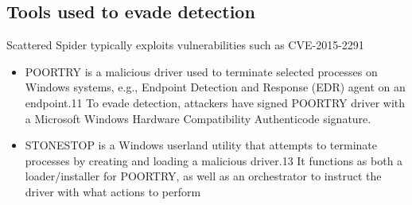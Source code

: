 \documentclass[
	letterpaper, %
	10pt, %
	unnumberedsections, %
	twoside, %
]{APAAssignment}
\begin{document}
\begin{appendices}
	\section{Tools used to evade detection}\label{app:DetectionAvoidance}
	Scattered Spider typically exploits vulnerabilities such as CVE-2015-2291 \cite{TrellixScattetedSpider}
	\begin{itemize}
		\item{POORTRY is a malicious driver used to terminate selected processes on Windows systems, e.g., Endpoint Detection and Response (EDR) agent on an endpoint.11 To evade detection, attackers have signed POORTRY driver with a Microsoft Windows Hardware Compatibility Authenticode signature.}
		\item{STONESTOP is a Windows userland utility that attempts to terminate processes by creating and loading a malicious driver.13 It functions as both a loader/installer for POORTRY, as well as an orchestrator to instruct the driver with what actions to perform}
	\end{itemize}



\end{appendices}
\end{document}
